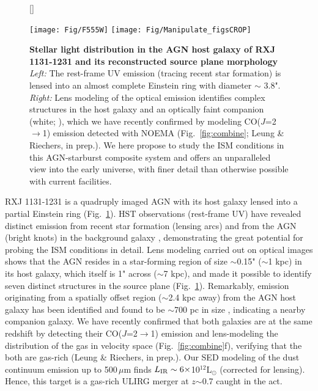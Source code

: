 \documentclass[12pt,a4paper]{article}
\newcommand{\Lsun}{\mbox{L$_{\odot}$}\xspace}
\newcommand{\rarr}{$\rightarrow$}
\newcommand{\bco}{\mbox{CO($J$=2\rarr1)}\xspace}
\newcommand{\rot}[3][HCN]{\mbox{#1($J$=#2\rarr#3)}\xspace}
\newcommand{\Fig}[1]{Fig.~\ref{fig:#1}}
\begin{document}
\begin{figure}[!tbhp]
\centering
{}[\FBwidth]
{
\hspace{-0.35em}
\vspace*{-0.55em}
\raggedleft
\caption{ \fontsize{10pt}{12pt}\selectfont 
{
\textbf{Stellar light distribution in the AGN host galaxy of RXJ 1131-1231 and its reconstructed source plane
morphology}
{\em Left:} The rest-frame UV emission (tracing recent star formation) 
is lensed into an almost complete Einstein ring with diameter $\sim$ 3.8". 
{\em Right:} Lens modeling of the optical emission identifies complex structures in the host galaxy and
an optically faint companion (white; \citealt{Claeskens06a}), 
which we have recently confirmed by modeling \bco emission detected with NOEMA
(\Fig{combine}; Leung \& Riechers, in prep.). 
We here propose to study
the ISM conditions in this AGN-starburst composite system and offers an unparalleled
view into the early universe, with finer
detail than otherwise possible with current facilities. 
}
\label{fig:HST}}}
{\hspace{-1em}
\texttt{[image: Fig/F555W]}
\hspace{-1.5em}
\texttt{[image: Fig/Manipulate\_figsCROP]}
\vspace{-1em}
}
\end{figure}
\vspace{-0.8em}
RXJ 1131-1231 is a quadruply imaged AGN with its host galaxy lensed 
into a partial Einstein ring (\Fig{HST}). 
HST observations (rest-frame UV) have revealed distinct emission 
from recent star formation (lensing arcs) and from the AGN (bright knots) in the background galaxy \citep{Sluse03a},
demonstrating the great potential for probing the 
ISM conditions in detail. Lens modeling carried out on optical images shows
that the AGN resides in a star-forming region of size $\sim$0.15" ($\sim$1 kpc)
in its host galaxy, which itself is 1" across ($\sim$7 kpc), and made it possible to identify
seven distinct structures in the source plane (\Fig{HST}). Remarkably, emission originating from 
a spatially offset region ($\sim$2.4 kpc away) from the AGN host galaxy has been identified and found 
to be $\sim$700 pc in size \citep{Brewer08a}, indicating a nearby companion galaxy. 
We have recently confirmed that both galaxies are at the same redshift by detecting their 
\rot[CO]{2}{1} emission and lens-modeling the distribution of the gas in velocity space (\Fig{combine}f), 
verifying that the both are gas-rich (Leung \& Riechers, in prep.). 
Our SED modeling of the dust continuum emission up to 500\,$\mu$m finds $L_{\rm IR}\sim6\times$10$^{12}$\Lsun 
(corrected for lensing). Hence, this target is a gas-rich ULIRG merger at $z$$\sim$0.7 caught in the act. 
\end{document}
